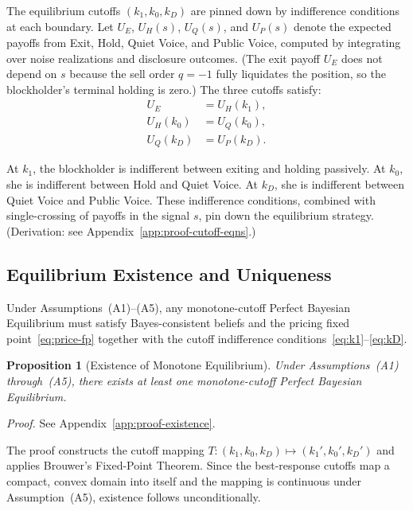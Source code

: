 \documentclass[11pt]{article}
\newtheorem{proposition}{Proposition}
\newcommand{\1}{\mathbf{1}}
\begin{document}
The equilibrium cutoffs $(k_1,k_0,k_D)$ are pinned down by indifference conditions at each boundary. Let $U_E$, $U_H(s)$, $U_Q(s)$, and $U_P(s)$ denote the expected payoffs from Exit, Hold, Quiet Voice, and Public Voice, computed by integrating over noise realizations and disclosure outcomes. (The exit payoff $U_E$ does not depend on $s$ because the sell order $q=-1$ fully liquidates the position, so the blockholder's terminal holding is zero.) The three cutoffs satisfy:
\begin{align}
U_E &= U_H(k_1), \label{eq:k1} \\
U_H(k_0) &= U_Q(k_0), \label{eq:k0} \\
U_Q(k_D) &= U_P(k_D). \label{eq:kD}
\end{align}

At $k_1$, the blockholder is indifferent between exiting and holding passively. At $k_0$, she is indifferent between Hold and Quiet Voice. At $k_D$, she is indifferent between Quiet Voice and Public Voice. These indifference conditions, combined with single-crossing of payoffs in the signal $s$, pin down the equilibrium strategy. (Derivation: see Appendix~\ref{app:proof-cutoff-eqns}.)

%
\subsection{Equilibrium Existence and Uniqueness}
%

Under Assumptions~\textup{(A1)}--\textup{(A5)}, any monotone-cutoff Perfect Bayesian Equilibrium must satisfy Bayes-consistent beliefs and the pricing fixed point~\eqref{eq:price-fp} together with the cutoff indifference conditions~\eqref{eq:k1}--\eqref{eq:kD}.

\begin{proposition}[Existence of Monotone Equilibrium]
\label{prop:existence}
Under Assumptions~\textup{(A1)} through~\textup{(A5)}, there exists at least one monotone-cutoff Perfect Bayesian Equilibrium.
\end{proposition}
\textit{Proof.} See Appendix~\ref{app:proof-existence}.

The proof constructs the cutoff mapping $T:(k_1,k_0,k_D)\mapsto(k_1',k_0',k_D')$ and applies Brouwer's Fixed-Point Theorem. Since the best-response cutoffs map a compact, convex domain into itself and the mapping is continuous under Assumption~\textup{(A5)}, existence follows unconditionally.
\end{document}
